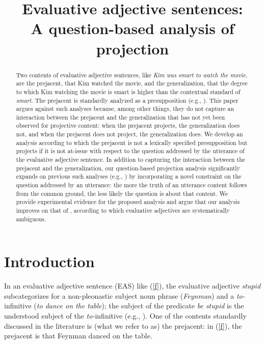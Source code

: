 \documentclass[11pt,fleqn]{article}
\title{Evaluative adjective sentences: \\ A question-based analysis of projection}
\author{}
\newcommand{\6}{\mbox{$[\hspace*{-.6mm}[$}}
\newcommand{\9}{\mbox{$]\hspace*{-.6mm}]$}}
\begin{document}

\maketitle


\begin{abstract}

Two contents of evaluative adjective sentences, like {\em Kim was smart to watch the movie}, are the prejacent, that Kim watched the movie, and the generalization, that the degree to which Kim watching the movie is smart is higher than the contextual standard of {\em smart}. The prejacent is standardly analyzed as a presupposition
(e.g., \citealt{norrick78,barker02,oshima09b,kertz2010}). This paper argues against such analyses because, among other things, they do not capture an interaction between the prejacent and the generalization that has not yet been observed for projective content: when the prejacent projects, the generalization does not, and when the prejacent does not project, the generalization does. We develop an analysis according to which the prejacent is not a lexically specified presupposition but projects if it is not at-issue with respect to the question addressed by the utterance of the evaluative adjective sentence. In addition to capturing the interaction between the prejacent and the generalization, our question-based projection analysis significantly expands on previous such analyses (e.g., \citealt{beaver-clark08,best-question,brst-ar,abrusan2011}) by incorporating a novel constraint on the question addressed by an utterance: the more the truth of an utterance content follows from the common ground, the less likely the question is about that content. We provide experimental evidence for the proposed analysis and argue that our analysis improves on that of \citealt{karttunen-etal2014}, according to which evaluative adjectives are systematically ambiguous. 

\end{abstract}


\section{Introduction}\label{s1}

In an evaluative adjective sentence (EAS) like (\ref{f}), the
evaluative adjective {\em stupid} subcategorizes for a non-pleonastic subject noun
phrase ({\em Feynman}) and a {\em to-}infinitive ({\em to
dance on the table}); the subject of the predicate {\em be stupid} is the understood subject of the {\em to-}infinitive (e.g., \citealt{wilkinson70, norrick78,barker02,kertz2010}). One of the contents standardly discussed in the literature is (what we refer to as) the prejacent: in (\ref{f}), the prejacent is that Feynman danced on the table.
\end{document}
